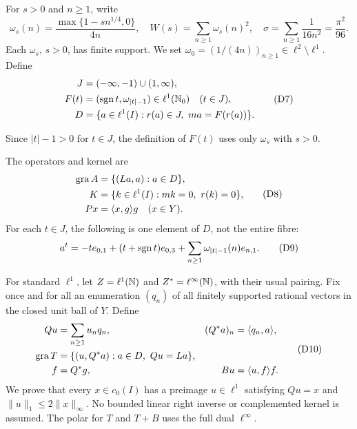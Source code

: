 For $s>0$ and $n\ge1$, write
\begin{equation}
\omega_s(n)=\frac{\max\{1-sn^{1/4},0\}}{4n},\quad
W(s)=\sum_{n\ge1}\omega_s(n)^2,\quad
\sigma=\sum_{n\ge1}\frac1{16n^2}=\frac{\pi^2}{96}.
\tag{D6}\label{eq:D6}
\end{equation}
Each $\omega_s$, $s>0$, has finite support. We set
$\omega_0=(1/(4n))_{n\ge1}\in\ell^2\setminus\ell^1$. Define
\begin{equation}
\begin{aligned}
J&=(-\infty,-1)\cup(1,\infty),\\
F(t)&=(\operatorname{sgn} t,\omega_{|t|-1})\in\ell^1(\mathbb N_0)\quad(t\in J),\\
D&=\{a\in\ell^1(I):r(a)\in J,\ ma=F(r(a))\}.
\end{aligned}
\tag{D7}\label{eq:D7}
\end{equation}

Since $|t|-1>0$ for $t\in J$, the definition of $F(t)$ uses only
$\omega_s$ with $s>0$.

The operators and kernel are
\begin{equation}
\begin{aligned}
\operatorname{gra} A&=\{(La,a):a\in D\},\\
K&=\{k\in\ell^1(I):mk=0,\ r(k)=0\},\\
Px&=\langle x,g\rangle g\quad(x\in Y).
\end{aligned}
\tag{D8}\label{eq:D8}
\end{equation}
For each $t\in J$, the following is one element of $D$, not the entire fibre:
\begin{equation}
a^t=-t e_{0,1}+(t+\operatorname{sgn} t)e_{0,3}
       +\sum_{n\ge1}\omega_{|t|-1}(n)e_{n,1}.
\tag{D9}\label{eq:D9}
\end{equation}


For standard $\ell^1$, let $Z=\ell^1(\mathbb N)$ and $Z^*=\ell^\infty(\mathbb N)$,
with their usual pairing. Fix once and for all an enumeration $(q_n)$ of
all finitely supported rational vectors in the closed unit ball of $Y$.
Define
\begin{equation}
\begin{aligned}
Qu&=\sum_{n\ge1}u_nq_n,& (Q^*a)_n&=\langle q_n,a\rangle,\\
\operatorname{gra} T&=\{(u,Q^*a):a\in D,\ Qu=La\},\\
f&=Q^*g,& Bu&=\langle u,f\rangle f.
\end{aligned}
\tag{D10}\label{eq:D10}
\end{equation}
We prove that every $x\in c_0(I)$ has a preimage $u\in\ell^1$ satisfying
$Qu=x$ and $\|u\|_1\le2\|x\|_\infty$. No bounded linear right inverse or
complemented kernel is assumed. The polar for $T$ and $T+B$ uses the full
dual $\ell^\infty$.


